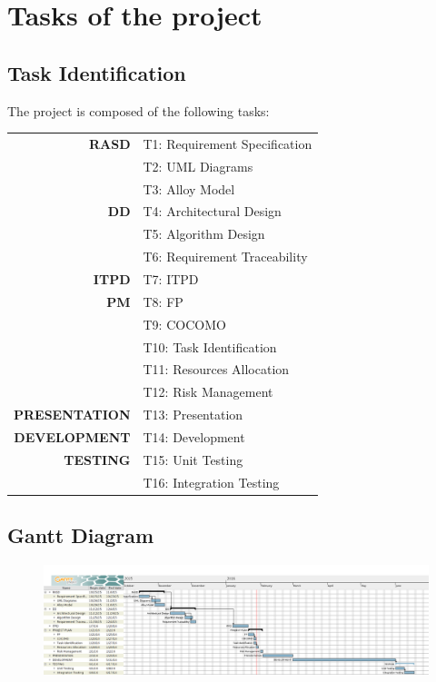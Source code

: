 \chapter{Tasks of the project}
\section{Task Identification}
The project is composed of the following tasks:

\begin{table}[H]
	\centering
	\begin{tabular}{ r l } 
		\textbf{RASD} & T1: Requirement Specification \\
					  & T2: UML Diagrams \\
			          & T3: Alloy Model \\
		\textbf{DD} & T4: Architectural Design \\
					& T5: Algorithm Design \\
					& T6: Requirement Traceability \\
		\textbf{ITPD} & T7: ITPD \\
		\textbf{PM} & T8: FP \\
					& T9: COCOMO \\
					& T10: Task Identification \\
					& T11: Resources Allocation \\
					& T12: Risk Management \\
		\textbf{PRESENTATION} & T13: Presentation \\
		\textbf{DEVELOPMENT} & T14: Development \\
		\textbf{TESTING} & T15: Unit Testing \\
						 & T16: Integration Testing
	\end{tabular}
\end{table}

\section{Gantt Diagram}

\begin{figure}[H]
	\centering
	\includegraphics[angle=90,scale=0.4]{Tasks/gantt}
\end{figure}

